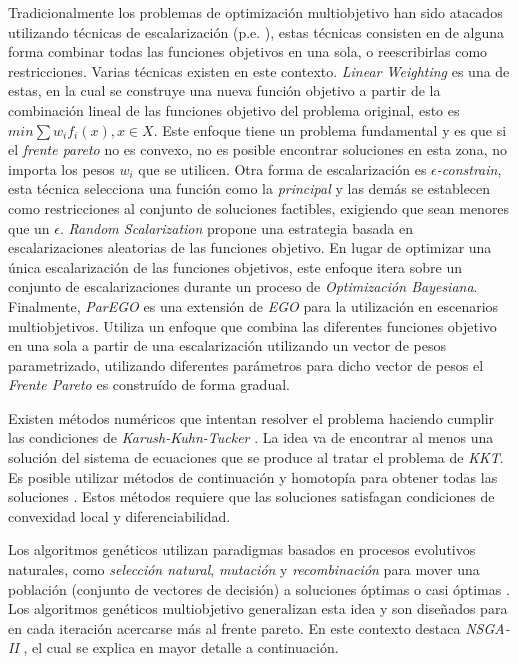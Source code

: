 Tradicionalmente los problemas de optimización multiobjetivo han sido atacados utilizando técnicas de escalarización (p.e. \parencite{miettinen2012nonlinear}), estas técnicas consisten en de alguna forma combinar todas las funciones objetivos en una sola, o reescribirlas como restricciones.
Varias técnicas existen en este contexto. \textit{Linear Weighting} es una de estas, en la cual se construye una nueva función objetivo a partir de la combinación lineal de las funciones objetivo del problema original, esto es $min \sum w_i f_i(x), x \in X$.
Este enfoque tiene un problema fundamental y es que si el \emph{frente pareto} no es convexo, no es posible encontrar soluciones en esta zona, no importa los pesos $w_i$ que se utilicen.
Otra forma de escalarización es \textit{$\epsilon$-constrain}, esta técnica selecciona una función como la \textit{principal} y las demás se establecen como restricciones al conjunto de soluciones factibles, exigiendo que sean menores que un $\epsilon$.
\emph{Random Scalarization} \parencite{paria2020flexible} propone una estrategia basada en escalarizaciones aleatorias de las funciones objetivo.
En lugar de optimizar una única escalarización de las funciones objetivos, este enfoque itera sobre un conjunto de escalarizaciones durante un proceso de \emph{Optimización Bayesiana}.
Finalmente, \emph{ParEGO} \parencite{knowles2006parego} es una extensión de \emph{EGO} \parencite{jones1998ego} para la utilización en escenarios multiobjetivos.
Utiliza un enfoque que combina las diferentes funciones objetivo en una sola a partir de una escalarización utilizando un vector de pesos parametrizado, utilizando diferentes parámetros para dicho vector de pesos el \emph{Frente Pareto} es construído de forma gradual.

Existen métodos numéricos que intentan resolver el problema haciendo cumplir las condiciones de \emph{Karush-Kuhn-Tucker} \parencite{kuhn2014nonlinear}.
La idea va de encontrar al menos una solución del sistema de ecuaciones que se produce al tratar el problema de \textit{KKT}.
Es posible utilizar métodos de continuación y homotopía para obtener todas las soluciones \parencite{hillermeier2001nonlinear, schutze2005continuation}.
Estos métodos requiere que las soluciones satisfagan condiciones de convexidad local y diferenciabilidad.

Los algoritmos genéticos utilizan paradigmas basados en procesos evolutivos naturales, como \textit{selección natural}, \textit{mutación} y \textit{recombinación} para mover una población (conjunto de vectores de decisión) a soluciones óptimas o casi óptimas \parencite{back1996evolutionary}.
Los algoritmos genéticos multiobjetivo generalizan esta idea y son diseñados para en cada iteración acercarse más al frente pareto.
En este contexto destaca \emph{NSGA-II} \parencite{deb2002nsgaii}, el cual se explica en mayor detalle a continuación.


